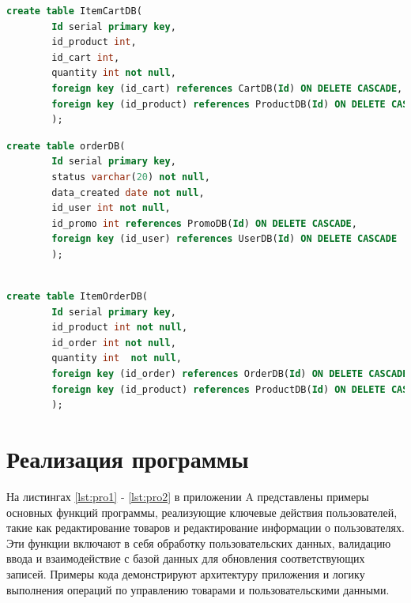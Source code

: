 \begin{center}
	\captionsetup{justification=raggedright,singlelinecheck=off}
	\begin{lstlisting}[label=lst:ItemDB, language=sql,caption=Создание таблицы ItemCartDB]
		create table ItemCartDB(
		Id serial primary key,
		id_product int,
		id_cart int,
		quantity int not null,
		foreign key (id_cart) references CartDB(Id) ON DELETE CASCADE,
		foreign key (id_product) references ProductDB(Id) ON DELETE CASCADE
		);
	\end{lstlisting}
\end{center}

\begin{center}
	\captionsetup{justification=raggedright,singlelinecheck=off}
	\begin{lstlisting}[label=lst:BillDB, language=sql,caption=Создание таблицы OrderDB]
		create table orderDB(
		Id serial primary key,
		status varchar(20) not null,
		data_created date not null,
		id_user int not null,
		id_promo int references PromoDB(Id) ON DELETE CASCADE,
		foreign key (id_user) references UserDB(Id) ON DELETE CASCADE
		);
		
	\end{lstlisting}
\end{center}

\begin{center}
	\captionsetup{justification=raggedright,singlelinecheck=off}
	\begin{lstlisting}[label=lst:DetailBillDB, language=sql,caption=Создание таблицы ItemOrderDB]
		create table ItemOrderDB(
		Id serial primary key,
		id_product int not null,
		id_order int not null,
		quantity int  not null,
		foreign key (id_order) references OrderDB(Id) ON DELETE CASCADE,
		foreign key (id_product) references ProductDB(Id) ON DELETE CASCADE
		);
	\end{lstlisting}
\end{center}

\section{Реализация программы}
На листингах \ref{lst:pro1} - \ref{lst:pro2} в приложении A представлены примеры основных функций программы, реализующие ключевые действия пользователей, такие как редактирование товаров и редактирование информации о пользователях. Эти функции включают в себя обработку пользовательских данных, валидацию ввода и взаимодействие с базой данных для обновления соответствующих записей. Примеры кода демонстрируют архитектуру приложения и логику выполнения операций по управлению товарами и пользовательскими данными.

